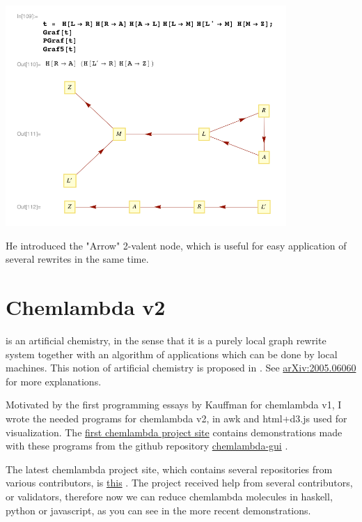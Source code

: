 \documentclass{article}
\begin{document}
\vspace{.5cm}
 
\centerline{\includegraphics[width=0.8\textwidth]{../img/chemical-concrete-machine/louis-second.png}
}
He introduced the "Arrow" 2-valent node, which is useful for easy application of several rewrites in the same time. 




\section{Chemlambda v2}
\label{ChemlambdaV2}
is an artificial chemistry, in the sense that it is a purely local graph rewrite system together with an algorithm of applications which can be done by local machines. This notion of artificial chemistry is proposed in \cite{tomita}. See \href{https://arxiv.org/abs/2005.06060}{arXiv:2005.06060} for more explanations.


Motivated by the first programming essays by Kauffman for chemlambda v1, I wrote the needed programs for  chemlambda v2, in awk and html+d3.js used for visualization. The \href{http://chorasimilarity.github.io/chemlambda-gui/index.html}{first chemlambda project site} \cite{first} contains demonstrations made with these programs from the github repository
\href{https://github.com/chorasimilarity/chemlambda-gui/blob/gh-pages/dynamic/README.md}{chemlambda-gui} \cite{firstrepo}.


The latest chemlambda project site, which contains several repositories from various contributors, is \href{https://chemlambda.github.io/index.html}{this} \cite{entry}. The project received help from several contributors, or validators, therefore now we can reduce chemlambda molecules in haskell, python or javascript, as you can see in the more recent demonstrations.
\end{document}
